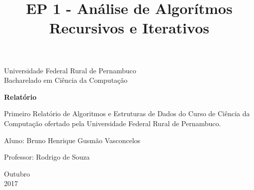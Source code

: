 \documentclass[a4paper, 12pt]{article}
\begin{document}
\begin{titlepage}
	\begin{center}
	

		\Huge{Universidade Federal Rural de Pernambuco}\\
		\large{Bacharelado em Ciência da Computação}\\ 
\vspace{15pt}
        
        \vspace{85pt}
        
		\textbf{\LARGE{Relatório}}
		\title{\large{EP 1 -  Análise de Algorítmos Recursivos e Iterativos}}
			
	\end{center}
\vspace{1,5cm}
	
	\begin{flushright}

   \begin{list}{}{
      \setlength{\leftmargin}{4.5cm}
      \setlength{\rightmargin}{0cm}
      \setlength{\labelwidth}{0pt}
      \setlength{\labelsep}{\leftmargin}}

      \item Primeiro Relatório de Algoritmos e Estruturas de Dados do Curso de Ciência da Computação ofertado pela Universidade Federal Rural de Pernambuco.

      \begin{list}{}{
      \setlength{\leftmargin}{0cm}
      \setlength{\rightmargin}{0cm}
      \setlength{\labelwidth}{0pt}
      \setlength{\labelsep}{\leftmargin}}

			\item Aluno: Bruno Henrique Gusmão Vasconcelos \
            \item Professor: Rodrigo de Souza \

      \end{list}
   \end{list}
\end{flushright}
\vspace{1cm}
\begin{center}
		\vspace{\fill}
		 Outubro\\
		 2017
			\end{center}
\end{titlepage}
\newpage
\newpage
\tableofcontents
\thispagestyle{empty}
\end{document}
